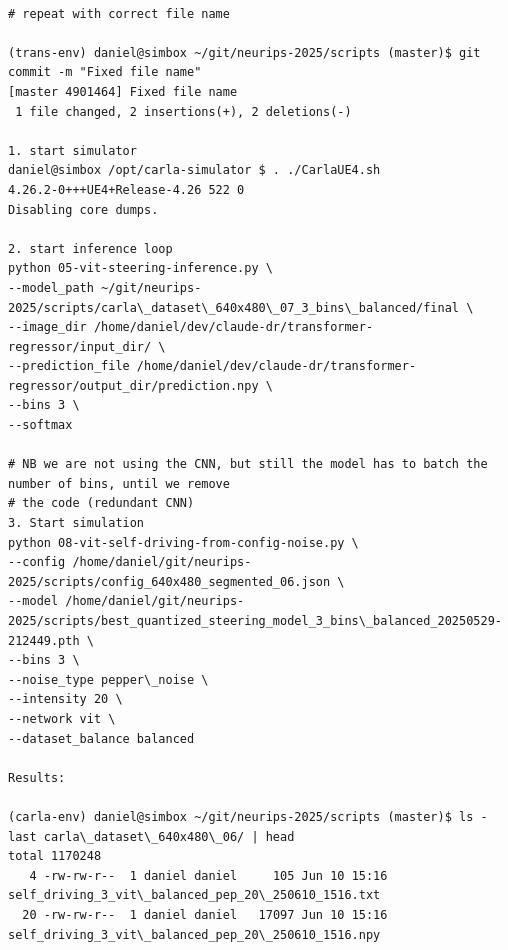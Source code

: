 \begin{verbatim}

# repeat with correct file name

(trans-env) daniel@simbox ~/git/neurips-2025/scripts (master)$ git commit -m "Fixed file name"
[master 4901464] Fixed file name
 1 file changed, 2 insertions(+), 2 deletions(-)
 
1. start simulator
daniel@simbox /opt/carla-simulator $ . ./CarlaUE4.sh 
4.26.2-0+++UE4+Release-4.26 522 0
Disabling core dumps.

2. start inference loop
python 05-vit-steering-inference.py \
--model_path ~/git/neurips-2025/scripts/carla\_dataset\_640x480\_07_3_bins\_balanced/final \
--image_dir /home/daniel/dev/claude-dr/transformer-regressor/input_dir/ \
--prediction_file /home/daniel/dev/claude-dr/transformer-regressor/output_dir/prediction.npy \
--bins 3 \
--softmax

# NB we are not using the CNN, but still the model has to batch the number of bins, until we remove
# the code (redundant CNN)
3. Start simulation
python 08-vit-self-driving-from-config-noise.py \
--config /home/daniel/git/neurips-2025/scripts/config_640x480_segmented_06.json \
--model /home/daniel/git/neurips-2025/scripts/best_quantized_steering_model_3_bins\_balanced_20250529-212449.pth \
--bins 3 \
--noise_type pepper\_noise \
--intensity 20 \
--network vit \
--dataset_balance balanced

Results:

(carla-env) daniel@simbox ~/git/neurips-2025/scripts (master)$ ls -last carla\_dataset\_640x480\_06/ | head
total 1170248
   4 -rw-rw-r--  1 daniel daniel     105 Jun 10 15:16 self_driving_3_vit\_balanced_pep_20\_250610_1516.txt
  20 -rw-rw-r--  1 daniel daniel   17097 Jun 10 15:16 self_driving_3_vit\_balanced_pep_20\_250610_1516.npy



\end{verbatim}

